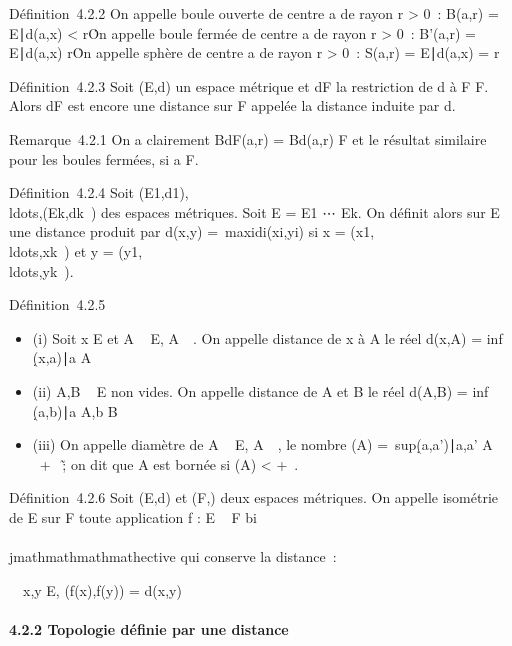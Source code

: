 Définition~4.2.2 On appelle boule ouverte de centre a de rayon r
\textgreater{} 0~: B(a,r) = \x \in
E∣d(a,x) \textless{} r\.

On appelle boule fermée de centre a de rayon r \textgreater{} 0~:
B'(a,r) = \x \in E∣d(a,x) \leq
r\.

On appelle sphère de centre a de rayon r \textgreater{} 0~: S(a,r) =
\x \in E∣d(a,x) =
r\

Définition~4.2.3 Soit (E,d) un espace métrique et dF la
restriction de d à F \times F. Alors dF est encore une distance sur
F appelée la distance induite par d.

Remarque~4.2.1 On a clairement BdF(a,r) =
Bd(a,r) \bigcap F et le résultat similaire pour les boules fermées,
si a \in F.

Définition~4.2.4 Soit
(E1,d1),\\ldots,(Ek,dk~)
des espaces métriques. Soit E = E1
\times⋯ \times Ek. On définit alors sur E une
distance produit par d(x,y) =\
maxidi(xi,yi) si x =
(x1,\\ldots,xk~)
et y =
(y1,\\ldots,yk~).

Définition~4.2.5

\begin{itemize}
\itemsep1pt\parskip0pt
\item
  (i) Soit x \in E et A \subset~ E, A\neq~\varnothing~. On appelle
  distance de x à A le réel d(x,A) = inf~
  \d(x,a)∣a \in
  A\
\item
  (ii) A,B \subset~ E non vides. On appelle distance de A et B le réel d(A,B)
  = inf~
  \d(a,b)∣a \in A,b \in
  B\
\item
  (iii) On appelle diamètre de A \subset~ E, A\neq~\varnothing~, le
  nombre \delta(A) =\
  sup\d(a,a')∣a,a' \in
  A\ \in {}~ \cup\ + \infty~\~; on
  dit que A est bornée si \delta(A) \textless{} +\infty~.
\end{itemize}

Définition~4.2.6 Soit (E,d) et (F,\delta) deux espaces métriques. On appelle
isométrie de E sur F toute application f : E \rightarrow~ F bi\\\\jmathmathmathmathective qui conserve
la distance~:

\forall~~x,y \in E, \delta(f(x),f(y)) = d(x,y)

\paragraph{4.2.2 Topologie définie par une distance}

